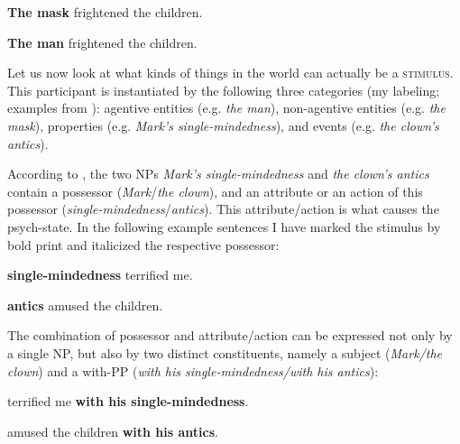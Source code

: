 \begin{exe}
	\ex \label{ex:agentive-nonagentive-rep}
	\begin{xlist}
		\item \label{ex:nonagentive-rep} \textbf{The mask} frightened the children.
		\item \label{ex:agentive-rep} \textbf{The man} frightened the children.
	\end{xlist}
\end{exe}

\noindent Let us now look at what kinds of things in the world can actually be a \textsc{stimulus}. This participant is instantiated by the following three categories (my labeling; examples from \citealt[77, 190]{Levin.1993}): agentive entities (e.g. \textit{the man}), non-agentive entities (e.g. \textit{the mask}), properties (e.g. \textit{Mark's single-mindedness}), and events (e.g. \textit{the clown's antics}).

According to \citet[77]{Levin.1993}, the two NPs \textit{Mark's single-mindedness} and \textit{the clown's antics} contain a possessor (\textit{Mark}/\textit{the clown}), and an attribute or an action of this possessor (\textit{single-mindedness}/\textit{antics}). This attribute/action is what causes the psych-state. In the following example sentences I have marked the stimulus by bold print and italicized the respective possessor: 

\begin{exe}
  \ex \label{ex:Levin-poss1}
  \begin{xlist}
    \item \textbf{ single-mindedness} terrified me.   
    \item \textbf{ antics} amused the children. 
  \end{xlist}
\end{exe}
  
\noindent The combination of possessor and attribute/action can be expressed not only by a single NP, but also by two distinct constituents, namely a subject (\textit{Mark/the clown}) and a with-PP (\textit{with his single-mindedness/with his antics}):

\begin{exe}
  \ex \label{ex:Levin-poss2}
  \begin{xlist}
    \item \label{ex:Levin-poss2a} terrified me \textbf{with his single-mindedness}.
    \item \label{ex:Levin-poss2b}  amused the children \textbf{with his antics}.
  \end{xlist}
\end{exe}

